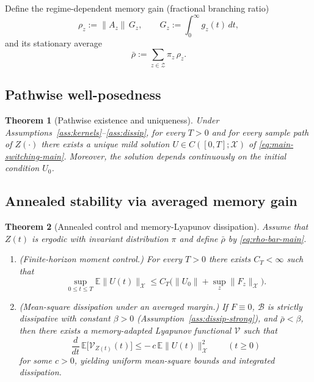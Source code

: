 \documentclass[12pt,a4paper]{article}
\theoremstyle{plain}
\newtheorem{theorem}{Theorem}[section]
\theoremstyle{definition}
\theoremstyle{remark}
\begin{document}
Define the regime-dependent memory gain (fractional branching ratio)
\begin{equation}
	\label{eq:rho-def-main}
	\rho_z := \|A_z\|\,G_z,
	\qquad
	G_z:=\int_0^\infty g_z(t)\,dt,
\end{equation}
and its stationary average
\begin{equation}
	\label{eq:rho-bar-main}
	\bar\rho := \sum_{z\in\mathcal Z}\pi_z\,\rho_z .
\end{equation}

\subsection*{Pathwise well-posedness}

\begin{theorem}[Pathwise existence and uniqueness]
	\label{thm:main-wp}
	Under Assumptions~\ref{ass:kernels}--\ref{ass:dissip}, for every $T>0$ and for
	every sample path of $Z(\cdot)$ there exists a unique mild solution
	$U\in C([0,T];\mathcal X)$ of \eqref{eq:main-switching-main}. Moreover, the
	solution depends continuously on the initial condition $U_0$.
\end{theorem}

\subsection*{Annealed stability via averaged memory gain}

\begin{theorem}[Annealed control and memory-Lyapunov dissipation]
	\label{thm:main-annealed}
	Assume that $Z(t)$ is ergodic with invariant distribution $\pi$ and define
	$\bar\rho$ by \eqref{eq:rho-bar-main}.
	\begin{enumerate}[label=(\roman*),leftmargin=0.8cm]
		\item (\emph{Finite-horizon moment control.})
		For every $T>0$ there exists $C_T<\infty$ such that
		\[
		\sup_{0\le t\le T}\mathbb E\|U(t)\|_{\mathcal X}
		\le C_T\big(\|U_0\|+\sup_z\|F_z\|_{\mathcal X}\big).
		\]
		\item (\emph{Mean-square dissipation under an averaged margin.})
		If $F\equiv 0$, $\mathcal B$ is strictly dissipative with constant $\beta>0$
		(Assumption~\ref{ass:dissip-strong}), and $\bar\rho<\beta$, then there exists a
		memory-adapted Lyapunov functional $\mathcal V$ such that
		\[
		\frac{d}{dt}\,\mathbb E\big[\mathcal V_{Z(t)}(t)\big]
		\le
		-\,c\,\mathbb E\|U(t)\|_{\mathcal X}^2
		\qquad (t\ge 0)
		\]
		for some $c>0$, yielding uniform mean-square bounds and integrated dissipation.
	\end{enumerate}
\end{theorem}
\end{document}
